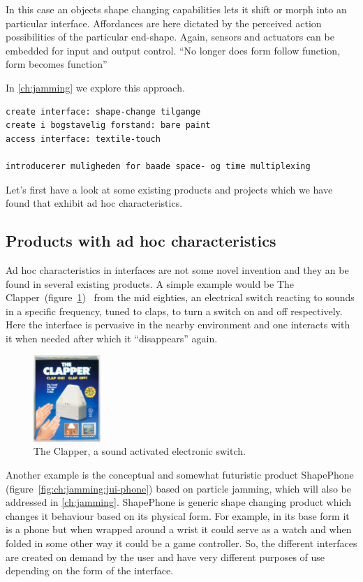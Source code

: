 In this case an objects shape changing capabilities lets it shift or morph into an particular interface.
Affordances are here dictated by the perceived action possibilities of the particular end-shape.
Again, sensors and actuators can be embedded for input and output control.
``No longer does form follow function, form becomes function''

In \autoref{ch:jamming} we explore this approach.

\begin{verbatim}
create interface: shape-change tilgange
create i bogstavelig forstand: bare paint
access interface: textile-touch

introducerer muligheden for baade space- og time multiplexing
\end{verbatim}

Let's first have a look at some existing products and projects which we have found that exhibit ad hoc characteristics. 

\subsection{Products with ad hoc characteristics}
Ad hoc characteristics in interfaces are not some novel invention and they an be found in several existing products.
A simple example would be The Clapper~(figure~\ref{ch:adhoc:theclapper})~\cite{theclapperWIKIPEDIA} from the mid eighties, an electrical switch reacting to sounds in a specific frequency, tuned to claps, to turn a switch on and off respectively.
Here the interface is pervasive in the nearby environment and one interacts with it when needed after which it ``disappears'' again.

\begin{figure}[hb]
	\centering
  		\includegraphics[width=1in]{figures/theclapper}
	\caption[The Clapper, a sound activated electronic switch.]
   {The Clapper, a sound activated electronic switch.}
   \label{ch:adhoc:theclapper}
\end{figure}

Another example is the conceptual and somewhat futuristic product ShapePhone (figure~\ref{fig:ch:jamming:jui-phone}) based on particle jamming, which will also be addressed in \autoref{ch:jamming}.
ShapePhone is generic shape changing product which changes it behaviour based on its physical form.
For example, in its base form it is a phone but when wrapped around a wrist it could serve as a watch and when folded in some other way it could be a game controller.
So, the different interfaces are created on demand by the user and have very different purposes of use depending on the form of the interface.

